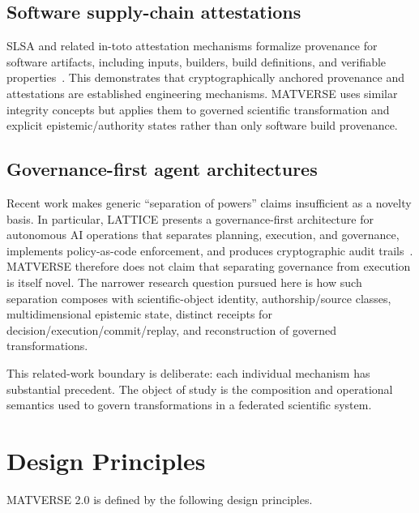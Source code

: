 \documentclass[11pt]{article}
\begin{document}
\subsection{Software supply-chain attestations}

SLSA and related in-toto attestation mechanisms formalize provenance for software artifacts, including inputs, builders, build definitions, and verifiable properties~\cite{slsa}. This demonstrates that cryptographically anchored provenance and attestations are established engineering mechanisms. MATVERSE uses similar integrity concepts but applies them to governed scientific transformation and explicit epistemic/authority states rather than only software build provenance.

\subsection{Governance-first agent architectures}

Recent work makes generic ``separation of powers'' claims insufficient as a novelty basis. In particular, LATTICE presents a governance-first architecture for autonomous AI operations that separates planning, execution, and governance, implements policy-as-code enforcement, and produces cryptographic audit trails~\cite{lattice}. MATVERSE therefore does not claim that separating governance from execution is itself novel. The narrower research question pursued here is how such separation composes with scientific-object identity, authorship/source classes, multidimensional epistemic state, distinct receipts for decision/execution/commit/replay, and reconstruction of governed transformations.

This related-work boundary is deliberate: each individual mechanism has substantial precedent. The object of study is the composition and operational semantics used to govern transformations in a federated scientific system.

\section{Design Principles}

MATVERSE 2.0 is defined by the following design principles.
\end{document}

